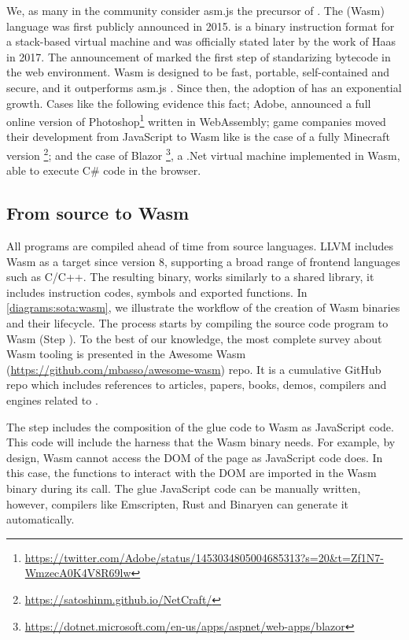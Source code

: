 We, as many in the community consider asm.js the precursor of \wasm. The \wasm (Wasm) language was first publicly announced in 2015. \wasm is a binary instruction format for a stack-based virtual machine and was officially stated later by the work of Haas \etal \cite{Haas_2017} in 2017. The announcement of \wasm marked the first step of standarizing bytecode in the web environment. Wasm is designed to be fast, portable, self-contained and secure, and it outperforms asm.js \cite{Haas_2017}. Since then, the adoption of \wasm has an exponential growth. Cases like the following evidence this fact; Adobe, announced a full online version of Photoshop\footnote{\url{https://twitter.com/Adobe/status/1453034805004685313?s=20&t=Zf1N7-WmzecA0K4V8R69lw}} written in WebAssembly;  game companies moved their development from JavaScript to Wasm like is the case of a fully Minecraft version \footnote{\url{https://satoshinm.github.io/NetCraft/}}; and the case of Blazor \footnote{\url{https://dotnet.microsoft.com/en-us/apps/aspnet/web-apps/blazor}}, a .Net virtual machine implemented in Wasm, able to execute C\# code in the browser.


\subsection*{From source to Wasm}

All \wasm programs are compiled ahead of time from source languages. LLVM includes Wasm as a target since version 8, supporting a broad range of frontend languages such as C/C++. The resulting binary, works similarly to a shared library, it includes instruction codes, symbols and exported functions. In \autoref{diagrams:sota:wasm}, we illustrate the workflow of the creation of Wasm binaries and their lifecycle. The process starts by compiling the source code program to Wasm (Step ). To the best of our knowledge, the most complete survey about Wasm tooling is presented in the Awesome Wasm (\url{https://github.com/mbasso/awesome-wasm}) repo. It is a cumulative GitHub repo which includes references to articles, papers, books, demos, compilers and engines related to \wasm. 

The step  includes the composition of the glue code to Wasm as JavaScript code. This code will include the harness that the Wasm binary needs. For example, by design, Wasm cannot access the DOM of the page as JavaScript code does. In this case, the functions to interact with the DOM are imported in the Wasm binary during its call. The glue JavaScript code can be manually written, however, compilers like Emscripten, Rust and Binaryen can generate it automatically.

